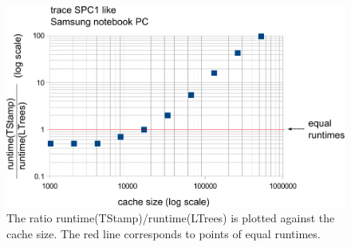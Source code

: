 \documentclass[a4paper,12pt, titlepage]{article}  %
\begin{document}
\begin{figure}[p]
	\centering
	\includegraphics[scale=0.8]{./experiments/samsung_SPC1.pdf}
	\caption{The ratio runtime(TStamp)/runtime(LTrees) is plotted against the cache size.
                     The red line corresponds to points of equal runtimes.} 
	\label{fig:samsung_SPC1}
\end{figure}
\end{document}
